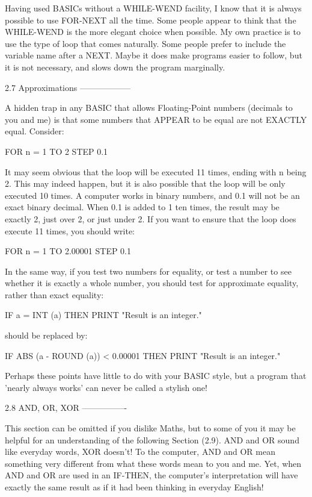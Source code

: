 Having  used  BASICs without a WHILE-WEND facility, I know that it  is  always 
possible  to use FOR-NEXT all the time. Some people appear to think  that  the 
WHILE-WEND is the more elegant choice when possible. My own practice is to use 
the  type  of  loop that comes naturally. Some people prefer  to  include  the 
variable name after a NEXT. Maybe it does make programs easier to follow,  but 
it is not necessary, and slows down the program marginally.


2.7 Approximations
------------------

A hidden trap in any BASIC that allows Floating-Point numbers (decimals to you 
and  me) is that some numbers that APPEAR to be equal are not  EXACTLY  equal. 
Consider:

        FOR n = 1 TO 2 STEP 0.1

It  may  seem obvious that the loop will be executed 11 times, ending  with  n 
being 2. This may indeed happen, but it is also possible that the loop will be 
only  executed 10 times. A computer works in binary numbers, and 0.1 will  not 
be  an exact binary decimal. When 0.1 is added to 1 ten times, the result  may 
be  exactly  2, just over 2, or just under 2. If you want to ensure  that  the 
loop does execute 11 times, you should write:

        FOR n = 1 TO 2.00001 STEP 0.1

In the same way, if you test two numbers for equality, or test a number to see 
whether  it  is  exactly  a whole number,  you  should  test  for  approximate 
equality, rather than exact equality:

        IF a = INT (a) THEN PRINT "Result is an integer."

should be replaced by:

        IF ABS (a - ROUND (a)) < 0.00001 THEN PRINT "Result is an integer."

Perhaps  these points have little to do with your BASIC style, but  a  program 
that 'nearly always works' can never be called a stylish one!


2.8 AND, OR, XOR
----------------

This section can be omitted if you dislike Maths, but to some of you it may be 
helpful for an understanding of the following Section (2.9). AND and OR  sound 
like  everyday words, XOR doesn't! To the computer, AND and OR mean  something 
very different from what these words mean to you and me. Yet, when AND and  OR 
are  used in an IF-THEN, the computer's interpretation will have  exactly  the 
same result as if it had been thinking in everyday English!

